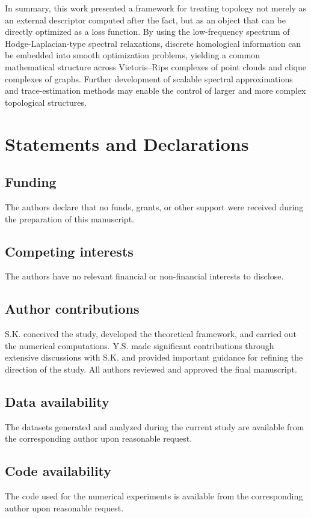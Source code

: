 \documentclass[pdflatex,sn-mathphys-ay]{sn-jnl}%
\theoremstyle{thmstyleone}%
\theoremstyle{thmstyletwo}%
\theoremstyle{thmstylethree}%
\begin{document}
In summary, this work presented a framework for treating topology not merely as an external descriptor computed after the fact, but as an object that can be directly optimized as a loss function. By using the low-frequency spectrum of Hodge-Laplacian-type spectral relaxations, discrete homological information can be embedded into smooth optimization problems, yielding a common mathematical structure across Vietoris--Rips complexes of point clouds and clique complexes of graphs. Further development of scalable spectral approximations and trace-estimation methods may enable the control of larger and more complex topological structures.

\section*{Statements and Declarations}

\subsection*{Funding}
The authors declare that no funds, grants, or other support were received during the preparation of this manuscript.

\subsection*{Competing interests}
The authors have no relevant financial or non-financial interests to disclose.

\subsection*{Author contributions}
S.K. conceived the study, developed the theoretical framework, and carried out the numerical computations. Y.S. made significant contributions through extensive discussions with S.K. and provided important guidance for refining the direction of the study. All authors reviewed and approved the final manuscript.

\subsection*{Data availability}
The datasets generated and analyzed during the current study are available from the corresponding author upon reasonable request.

\subsection*{Code availability}
The code used for the numerical experiments is available from the corresponding author upon reasonable request.
\end{document}
